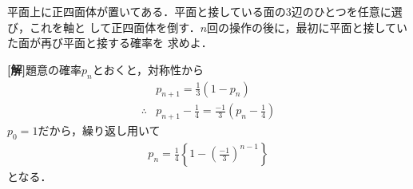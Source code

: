 \documentclass[a4j]{jarticle}
\begin{document}

     \begin{oframed}
     平面上に正四面体が置いてある．平面と接している面の$3$辺のひとつを任意に選び，これを軸と
     して正四面体を倒す．$n$回の操作の後に，最初に平面と接していた面が再び平面と接する確率を
     求めよ．
     \end{oframed}

\setlength{\columnseprule}{0.4pt}
\begin{multicols}{2}
{\bf[解]}題意の確率$p_n$とおくと，対称性から
    \begin{align*}
    &p_{n+1}=\frac{1}{3}(1-p_n) \\ 
    \therefore &p_{n+1}-\frac{1}{4}=\frac{-1}{3}\left(p_n-\frac{1}{4}\right)
    \end{align*}
$p_0=1$だから，繰り返し用いて
     \begin{align*}
     p_n=\frac{1}{4}\left\{1-\left(\frac{-1}{3}\right)^{n-1}\right\} \tag{答}
     \end{align*}
となる．
\newpage
\end{multicols}
\end{document}
